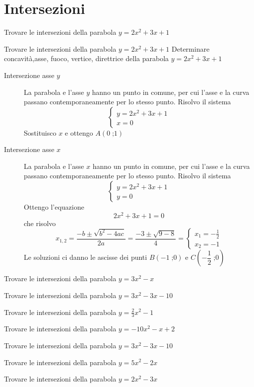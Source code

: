 \section{Intersezioni}
\begin{exercise}[no solution]
	Trovare le intersezioni della parabola $y=2x^2+3x+1$
\end{exercise}
\begin{exercise}
Trovare le intersezioni della parabola $y=2x^2+3x+1$
	\tcblower
	Determinare concavità,asse, fuoco, vertice, direttrice della parabola $y=2x^2+3x+1$
	\begin{description}
		\item[Intersezione asse $y$] La parabola e l'asse $y$ hanno un punto in comune, per cui l'asse e la curva passano contemporaneamente per lo stesso punto. Risolvo il sistema \[\begin{cases}
		y=2x^2+3x+1\\
		x=0
		\end{cases}\] Sostituisco $x$ e ottengo $A\left(0\;\text{;}1\right)$
			\item[Intersezione asse $x$] La parabola e l'asse $x$ hanno un punto in comune, per cui l'asse e la curva passano contemporaneamente per lo stesso punto. Risolvo il sistema \[\begin{cases}
		y=2x^2+3x+1\\
		y=0
		\end{cases}\] Ottengo l'equazione \[2x^2+3x+1=0\] che risolvo
		\[x_{1,2}=\dfrac{-b\pm\sqrt{b^2-4ac}}{2a}=\dfrac{-3\pm\sqrt{9-8}}{4}=\begin{cases}
		x_1=-\frac{1}{2}\\
		x_2=-1
		\end{cases} \] Le soluzioni ci danno le ascisse dei  punti $B\left(-1\;\text{;}0\right)$ e $C\left(-\dfrac{1}{2}\;\text{;}0\right)$
	\end{description}
\end{exercise}
\begin{exercise}[no solution]
	Trovare le intersezioni della parabola $y=3x^2-x$
\end{exercise}
\begin{exercise}[no solution]
	Trovare le intersezioni della parabola $y=3x^2-3x-10$
\end{exercise}
\begin{exercise}[no solution]
	Trovare le intersezioni della parabola $y=\frac{2}{3}x^2-1$
\end{exercise}
\begin{exercise}[no solution]
	Trovare le intersezioni della parabola $y=-10x^2-x+2$
\end{exercise}

\begin{exercise}[no solution]
	Trovare le intersezioni della parabola $y=3x^2-3x-10$
\end{exercise}
\begin{exercise}[no solution]
	Trovare le intersezioni della parabola $y=5x^2-2x$
\end{exercise}
\begin{exercise}[no solution]
	Trovare le intersezioni della parabola $y=2x^2-3x$
\end{exercise}